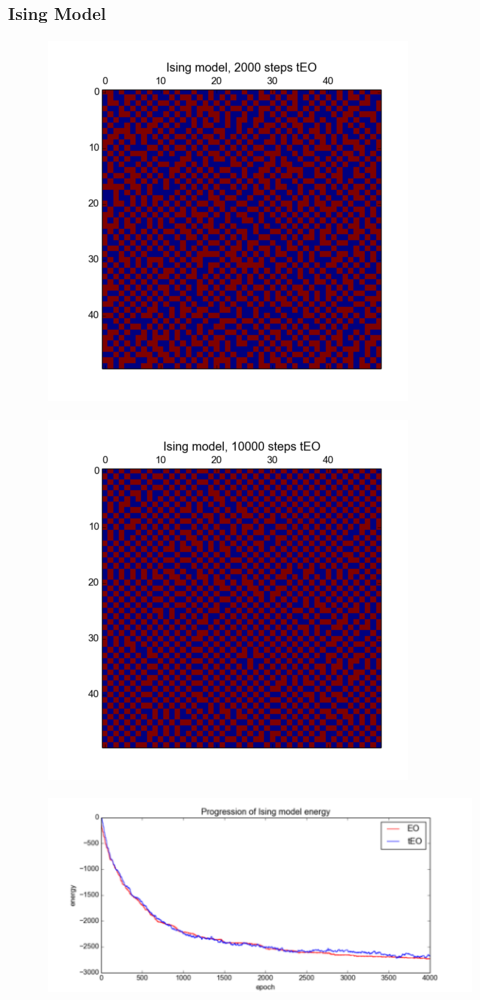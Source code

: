 \documentclass[12pt]{article}
\begin{document}
  \frametitle{Ising Model}
  \begin{figure}
    \includegraphics{2000}
  \end{figure}
  \begin{figure}
    \includegraphics{10000}
  \end{figure}
  \begin{figure}
    \includegraphics{ising_energy_unzoomed}
  \end{figure}
  
\end{document}
